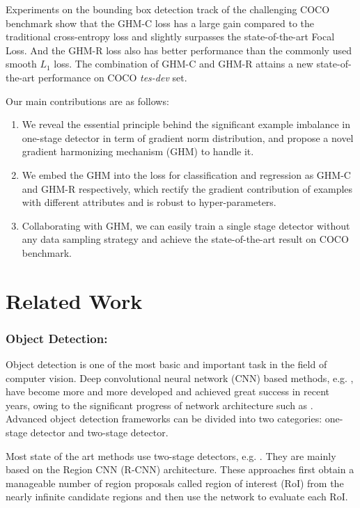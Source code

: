 \documentclass[letterpaper]{article} %
\begin{document}
Experiments on the bounding box detection track of the challenging COCO benchmark show that the GHM-C loss has a large gain compared to the traditional cross-entropy loss and slightly surpasses the state-of-the-art Focal Loss. And the GHM-R loss also has better performance than the commonly used smooth $L_1$ loss. The combination of GHM-C and GHM-R attains a new state-of-the-art performance on COCO \textit{tes-dev} set.

Our main contributions are as follows:
\begin{enumerate}
\item We reveal the essential principle behind the significant example imbalance in one-stage detector in term of gradient norm distribution, and propose a novel gradient harmonizing mechanism (GHM) to handle it.
%
\item We embed the GHM into the loss for classification and regression as GHM-C and GHM-R respectively, which rectify the gradient contribution of examples with different attributes and is robust to hyper-parameters. 
%
\item Collaborating with GHM, we can easily train a single stage detector without any data sampling strategy and achieve the state-of-the-art result on COCO benchmark.
\end{enumerate}


\section{Related Work}

\subsubsection{Object Detection:}
Object detection is one of the most basic and important task in the field of computer vision. Deep convolutional neural network (CNN) based methods, e.g. \cite{faster,ssd,yolov2,mask}, have become more and more developed and achieved great success in recent years, owing to the significant progress of network architecture such as \cite{vgg,googlenet,resnet,densely}. Advanced object detection frameworks can be divided into two categories: one-stage detector and two-stage detector.

 Most state of the art methods use two-stage detectors, e.g. \cite{fast,faster,li2017zoom,mask,fpn,zeng2018crafting}. They are mainly based on the Region CNN (R-CNN) architecture. These approaches first obtain a manageable number of region proposals called region of interest (RoI) from the nearly infinite candidate regions and then use the network to evaluate each RoI. 
\end{document}
